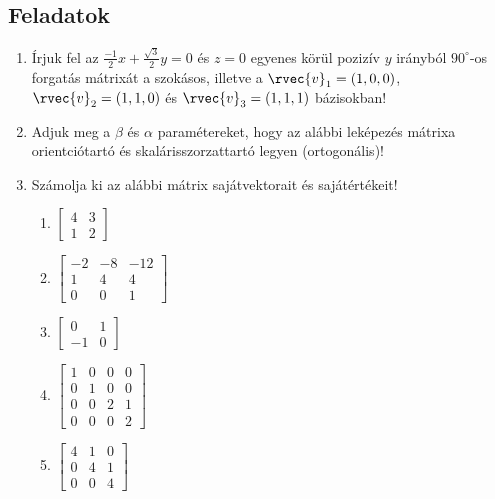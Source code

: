 \documentclass[a4paper, 12pt]{scrartcl}
\begin{document}
\clearpage
\subsection{Feladatok}
\begin{enumerate}
  \item Írjuk fel az $\frac{-1}{2}x + \frac{\sqrt{3}}{2}y = 0$ és $z=0$ egyenes körül pozizív $y$ irányból $90^\circ$-os forgatás mátrixát a szokásos, illetve a $\rvec{v}_1 = (1,0,0)$, $\rvec{v}_2 =(1,1,0)$ és $\rvec{v}_3 = (1,1,1)$ bázisokban!
  \item Adjuk meg a $\beta$ és $\alpha$ paramétereket, hogy az alábbi leképezés mátrixa orientciótartó és skalárisszorzattartó legyen (ortogonális)!
  \item Számolja ki az alábbi mátrix sajátvektorait és sajátértékeit!
        \begin{multicols}{3}
          \begin{enumerate}
            \item $\begin{bmatrix}
                      4 & 3 \\
                      1 & 2
                    \end{bmatrix}$
            \item $\begin{bmatrix}
                      -2 & -8 & -12 \\
                      1  & 4  & 4   \\
                      0  & 0  & 1
                    \end{bmatrix}$
            \item $\begin{bmatrix}
                      0  & 1 \\
                      -1 & 0
                    \end{bmatrix}$
            \item $\begin{bmatrix}
                      1 & 0 & 0 & 0 \\
                      0 & 1 & 0 & 0 \\
                      0 & 0 & 2 & 1 \\
                      0 & 0 & 0 & 2
                    \end{bmatrix}$

            \item $ \begin{bmatrix}
                      4 & 1 & 0 \\
                      0 & 4 & 1 \\
                      0 & 0 & 4
                    \end{bmatrix}$


\end{enumerate}
\end{multicols}
\end{enumerate}
\end{document}
